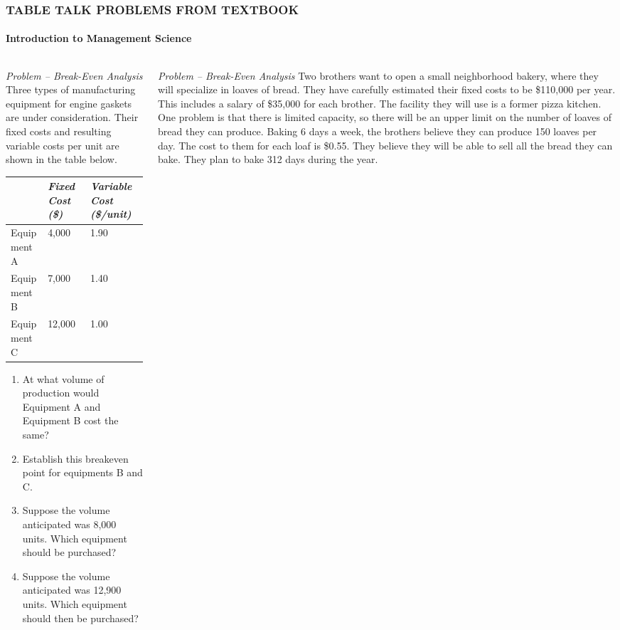 \documentclass[14 pt]{beamer}
\begin{document}
\begin{frame}[t]
\frametitle{TABLE TALK PROBLEMS FROM TEXTBOOK}
\framesubtitle{Introduction to Management Science}

\begin{columns}[t]
\begin{column}{0.45\textwidth}
\emph{Problem -- Break-Even Analysis}
\vskip0.5cm%
Three types of manufacturing equipment for engine gaskets are under consideration. Their fixed costs and resulting variable costs per unit are shown in the table below.
\begin{table}
\begin{tabular}{p{}p{}p{}}
  \hline
              & \emph{Fixed Cost (\$)} & \emph{Variable Cost (\$/unit)} \\
  \hline
  Equipment A & 4,000  & 1.90 \\
  Equipment B & 7,000  & 1.40\\
  Equipment C & 12,000 & 1.00\\
  \hline
\end{tabular}
\end{table}

\begin{enumerate}
  \item At what volume of production would Equipment A and Equipment B cost the same?
  \item Establish this breakeven point for equipments B and C.
  \item Suppose the volume anticipated was 8,000 units. Which equipment should be purchased?
  \item Suppose the volume anticipated was 12,900 units. Which equipment should then be purchased?
\end{enumerate}
\end{column}

\begin{column}{0.45\textwidth}
\emph{Problem -- Break-Even Analysis}
\vskip0.5cm%
Two brothers want to open a small neighborhood bakery, where they will specialize in loaves of bread. They have carefully estimated their fixed costs to be \$110,000 per year. This includes a salary of \$35,000 for each brother.
\vskip0.5cm%
The facility they will use is a former pizza kitchen. One problem is that there is limited capacity, so there will be an upper limit on the number of loaves of bread they can produce.
\vskip0.5cm%
Baking 6 days a week, the brothers believe they can produce 150 loaves per day. The cost to them for each loaf is \$0.55. They believe they will be able to sell all the bread they can bake. They plan to bake 312 days during the year.


\end{column}
\end{columns}
\end{frame}
\end{document}
